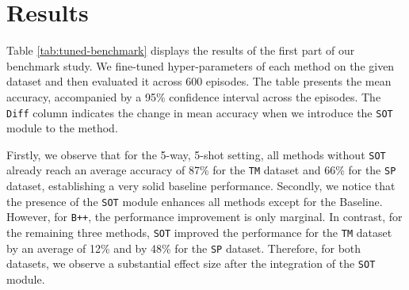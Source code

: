 \section{Results}
Table \ref{tab:tuned-benchmark} displays the results of the first part of 
our benchmark study. We fine-tuned hyper-parameters of each method on the given dataset and 
then evaluated it across 600 episodes. The table presents the mean accuracy,
 accompanied by a 95\% confidence interval across the episodes. 
 The \texttt{Diff} column indicates the change in mean accuracy when we 
 introduce the \texttt{SOT} module to the method.

Firstly, we observe that for the 5-way, 5-shot setting, all methods without 
\texttt{SOT} already reach an average accuracy of 87\% for the \texttt{TM} 
dataset and 66\% for the \texttt{SP} dataset, establishing a very solid baseline performance.
Secondly, we notice that the presence of the \texttt{SOT} module enhances all 
methods except for the Baseline. However, for \texttt{B++}, the performance improvement is only marginal. 
In contrast, for the remaining three methods, \texttt{SOT} improved the performance for the \texttt{TM} dataset 
by an average of 12\% and by 48\% for the \texttt{SP} dataset. 
Therefore, for both datasets, we observe a substantial effect size after the integration of the \texttt{SOT} module.

